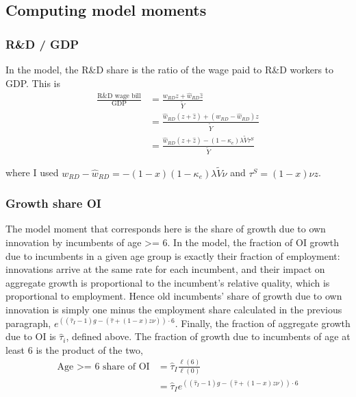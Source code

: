 \documentclass[11pt,english]{article}
\begin{document}
\subsection{Computing model moments}

\subsubsection{R\&D / GDP}\label{appendix:calibration:rd/gdp}

In the model, the R\&D share is the ratio of the wage paid to R\&D workers to GDP. This is
\begin{align*}
\frac{\textrm{R\&D wage bill}}{\textrm{GDP}} &= \frac{w_{RD} z + \hat{w}_{RD} \hat{z}}{\tilde{Y}} \\ 
&= \frac{\hat{w}_{RD} (z + \hat{z}) + (w_{RD} - \hat{w}_{RD})z}{\tilde{Y}} \\
&= \frac{\hat{w}_{RD} (z + \hat{z}) - (1-\kappa_e) \lambda \tilde{V} \tau^S}{\tilde{Y}}
\end{align*}

where I used $w_{RD} - \hat{w}_{RD} = -(1-x)(1-\kappa_e) \lambda \tilde{V} \nu$ and $\tau^S = (1-x)\nu z$. 

\subsubsection{Growth share OI}\label{appendix:calibration:growthShareOI}

The model moment that corresponds here is the share of growth due to own innovation by incumbents of age >= 6. In the model, the fraction of OI growth due to incumbents in a given age group is exactly their fraction of employment: innovations arrive at the same rate for each incumbent, and their impact on aggregate growth is proportional to the incumbent's relative quality, which is proportional to employment. Hence old incumbents' share of growth due to own innovation is simply one minus the employment share calculated in the previous paragraph, $e^{((\hat{\tau}_I -1)g - (\hat{\tau} + (1-x)z \nu))\cdot 6}$. Finally, the fraction of aggregate growth due to OI is $\hat{\tau}_i$, defined above. The fraction of growth due to incumbents of age at least 6 is the product of the two, 
\begin{align*}
\textrm{Age >= 6 share of OI} &= \hat{\tau}_I \frac{\ell(6)}{\ell(0)} \\
&= \hat{\tau}_I e^{((\hat{\tau}_I -1)g - (\hat{\tau} + (1-x)z \nu))\cdot 6} 
\end{align*}
\end{document}
